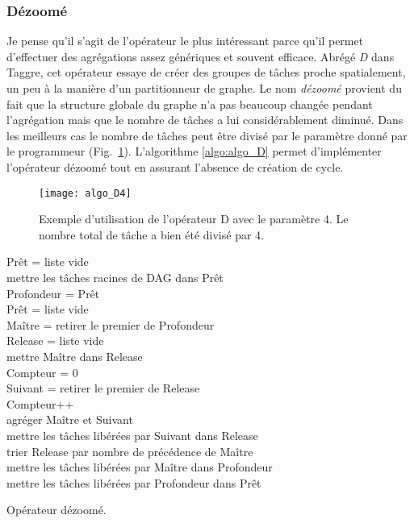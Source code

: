 \subsubsection{Dézoomé}
Je pense qu'il s'agit de l'opérateur le plus intéressant parce qu'il permet d'effectuer des agrégations assez génériques et souvent efficace.
%
Abrégé {\em D} dans Taggre, cet opérateur essaye de créer des groupes de tâches proche spatialement, un peu à la manière d'un partitionneur de graphe.
%
Le nom {\em dézoomé} provient du fait que la structure globale du graphe n'a pas beaucoup changée pendant l'agrégation mais que le nombre de tâches a lui considérablement diminué.
%
Dans les meilleurs cas le nombre de tâches peut être divisé par le paramètre donné par le programmeur (Fig.~\ref{fig:algo_D4}).
%
L'algorithme \ref{algo:algo_D} permet d'implémenter l'opérateur dézoomé tout en assurant l'absence de création de cycle.
\begin{figure}[t!]
  \centering
  \texttt{[image: algo\_D4]}
  \caption{Exemple d'utilisation de l'opérateur D avec le paramètre 4. Le nombre total de tâche a bien été divisé par 4.}
  \label{fig:algo_D4}
\end{figure}

\begin{algorithm}
  {\sc Prêt} = liste vide \\
  mettre les tâches racines de DAG dans {\sc Prêt} \\
   {
    {\sc Profondeur} = {\sc Prêt} \\
    {\sc Prêt} = liste vide \\
     {
      {\sc Maître} = retirer le premier de {\sc Profondeur} \\
      {\sc Release} = liste vide \\
      mettre {\sc Maître} dans {\sc Release} \\
      {\sc Compteur} = 0 \\
       {
        {\sc Suivant} = retirer le premier de {\sc Release} \\
        {\sc Compteur}++\\
        agréger {\sc Maître} et {\sc Suivant}\\
        mettre les tâches libérées par {\sc Suivant} dans {\sc Release} \\
        trier {\sc Release} par nombre de précédence de {\sc Maître} \\
      }
      mettre les tâches libérées par {\sc Maître} dans {\sc Profondeur} \\
    }
    mettre les tâches libérées par {\sc Profondeur} dans {\sc Prêt}\\
  }
  \label{algo:algo_D}
  \caption{Opérateur dézoomé.}
\end{algorithm}

